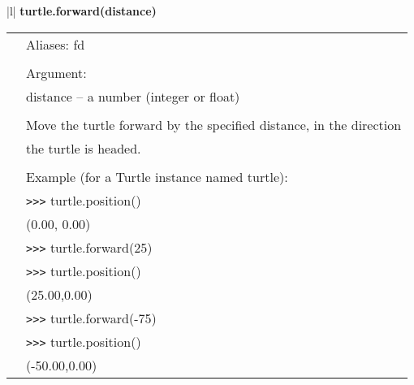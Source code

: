 \begin{center}
{\begin{tabular}{|l|}
{\bf    turtle.forward(distance)} \\
   \begin{tabular}{p{0.25in}p{4in}}
&        Aliases:  fd \\
&  \\
&        Argument: \\
&        distance -- a number (integer or float) \\
&  \\
&        Move the turtle forward by the specified distance, in the direction \\
&        the turtle is headed. \\
&  \\
&        Example (for a Turtle instance named turtle): \\
&        \verb+>+\verb+>+\verb+>+ turtle.position() \\
&        (0.00, 0.00) \\
&        \verb+>+\verb+>+\verb+>+ turtle.forward(25) \\
&        \verb+>+\verb+>+\verb+>+ turtle.position() \\
&        (25.00,0.00) \\
&        \verb+>+\verb+>+\verb+>+ turtle.forward(-75) \\
&        \verb+>+\verb+>+\verb+>+ turtle.position() \\
&        (-50.00,0.00) \\
\end{tabular} \\ \hline


\end{tabular}}
\end{center}
